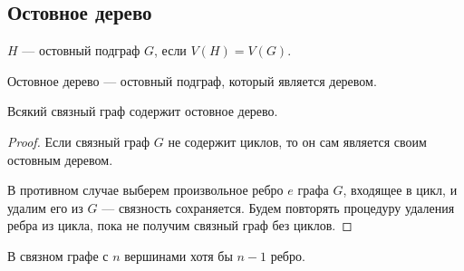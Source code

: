 \subsection{Остовное дерево}

\begin{defn}
    $H$ --- остовный подграф $G$, если $V(H) = V(G)$.
\end{defn}

\begin{defn}
    Остовное дерево --- остовный подграф, который является деревом.
\end{defn}

\begin{statement}
    Всякий связный граф содержит остовное дерево.
\end{statement}

\begin{proof}
    
    Если связный граф $G$ не содержит циклов, то он сам является своим остовным деревом.

    В противном случае выберем произвольное ребро $e$ графа $G$, входящее в цикл, и удалим его из $G$ --- связность сохраняется. Будем повторять процедуру удаления ребра из цикла, пока не получим связный граф без циклов.

\end{proof}

\begin{follow}
    В связном графе с $n$ вершинами хотя бы $n - 1$ ребро.
\end{follow}